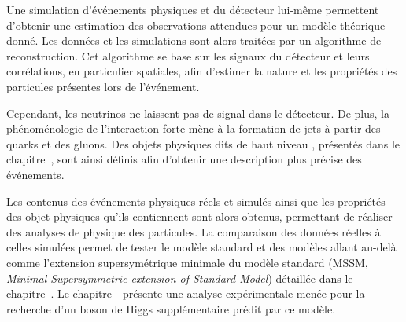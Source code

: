 \par Une simulation d'événements physiques et du détecteur lui-même permettent d'obtenir une estimation des observations attendues pour un modèle théorique donné.
Les données et les simulations sont alors traitées par un algorithme de reconstruction.
Cet algorithme se base sur les signaux du détecteur et leurs corrélations, en particulier spatiales, afin d'estimer la nature et les propriétés des particules présentes lors de l'événement.
\par
Cependant, les neutrinos ne laissent pas de signal dans le détecteur.
De plus, la phénoménologie de l'interaction forte mène à la formation de \og jets \fg{} à partir des quarks et des gluons.
Des objets physiques dits de \og haut niveau \fg, présentés dans le chapitre~, sont ainsi définis afin d'obtenir une description plus précise des événements.
\par Les contenus des événements physiques réels et simulés ainsi que les propriétés des objet physiques qu'ils contiennent sont alors obtenus, permettant de réaliser des analyses de physique des particules.
La comparaison des données réelles à celles simulées permet de tester le modèle standard et des modèles allant au-delà comme l'extension supersymétrique minimale du modèle standard (MSSM, \emph{Minimal Supersymmetric extension of Standard Model}) détaillée dans le chapitre~.
Le chapitre~\ présente une analyse expérimentale menée pour la recherche d'un boson de Higgs supplémentaire prédit par ce modèle.
